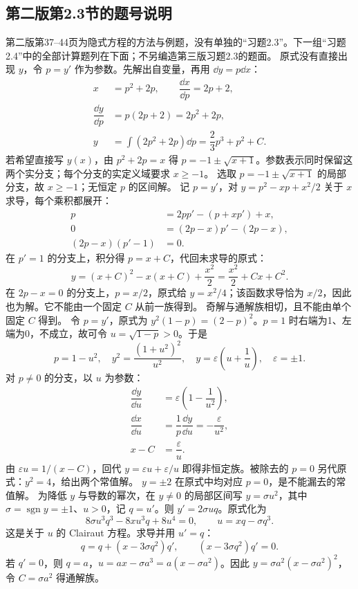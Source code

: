 \subsection*{第二版第2.3节的题号说明}
第二版第37--44页为隐式方程的方法与例题，没有单独的“习题2.3”。下一组“习题2.4”中的全部计算题列在下面；不另编造第三版习题2.3的题面。
原式没有直接出现 $y$，令 $p=y'$ 作为参数。先解出自变量，再用 $\dd y=p\dd x$：
\[
\begin{aligned}
x&=p^2+2p,\qquad \dfrac{\dd x}{\dd p}=2p+2,\\
\dfrac{\dd y}{\dd p}&=p(2p+2)=2p^2+2p,\\
y&=\int(2p^2+2p)\dd p=\dfrac23p^3+p^2+C.
\end{aligned}
\]
若希望直接写 $y(x)$，由 $p^2+2p=x$ 得 $p=-1\pm\sqrt{x+1}$。参数表示同时保留这两个实分支；每个分支的实定义域要求 $x\ge-1$。
选取 $p=-1\pm\sqrt{x+1}$ 的局部分支，故 $x\ge-1$；无恒定 $p$ 的区间解。
记 $p=y'$，对 $y=p^2-xp+x^2/2$ 关于 $x$ 求导，每个乘积都展开：
\[
\begin{aligned}
p&=2pp'-(p+xp')+x,\\
0&=(2p-x)p'-(2p-x),\\
(2p-x)(p'-1)&=0.
\end{aligned}
\]
在 $p'=1$ 的分支上，积分得 $p=x+C$，代回未求导的原式：
\[
y=(x+C)^2-x(x+C)+\dfrac{x^2}{2}
=\dfrac{x^2}{2}+Cx+C^2.
\]
在 $2p-x=0$ 的分支上，$p=x/2$，原式给 $y=x^2/4$；该函数求导恰为 $x/2$，因此也为解。它不能由一个固定 $C$ 从前一族得到。
奇解与通解族相切，且不能由单个固定 $C$ 得到。
令 $p=y'$，原式为 $y^2(1-p)=(2-p)^2$。$p=1$ 时右端为1、左端为0，不成立，故可令 $u=\sqrt{1-p}>0$。于是
\[
p=1-u^2,\quad y^2=\dfrac{(1+u^2)^2}{u^2},\quad
 y=\varepsilon\left(u+\dfrac1u\right),\quad\varepsilon=\pm1.
\]
对 $p\ne0$ 的分支，以 $u$ 为参数：
\[
\begin{aligned}
\dfrac{\dd y}{\dd u}&=\varepsilon\left(1-\dfrac1{u^2}\right),\\
\dfrac{\dd x}{\dd u}&=\dfrac1p\dfrac{\dd y}{\dd u}
=-\dfrac\varepsilon{u^2},\\
x-C&=\dfrac\varepsilon u.
\end{aligned}
\]
由 $\varepsilon u=1/(x-C)$，回代 $y=\varepsilon u+\varepsilon/u$ 即得非恒定族。被除去的 $p=0$ 另代原式：$y^2=4$，给出两个常值解。
$y=\pm2$ 在原式中均对应 $p=0$，是不能漏去的常值解。
为降低 $y$ 与导数的幂次，在 $y\ne0$ 的局部区间写 $y=\sigma u^2$，其中 $\sigma=\operatorname{sgn}y=\pm1$、$u>0$，记 $q=u'$。则 $y'=2\sigma uq$。原式化为
\[
8\sigma u^3q^3-8xu^3q+8u^4=0,
\qquad u=xq-\sigma q^3.
\]
这是关于 $u$ 的 Clairaut 方程。求导并用 $u'=q$：
\[
q=q+(x-3\sigma q^2)q',\qquad (x-3\sigma q^2)q'=0.
\]
若 $q'=0$，则 $q=a$，$u=ax-\sigma a^3=a(x-\sigma a^2)$。因此 $y=\sigma a^2(x-\sigma a^2)^2$，令 $C=\sigma a^2$ 得通解族。

